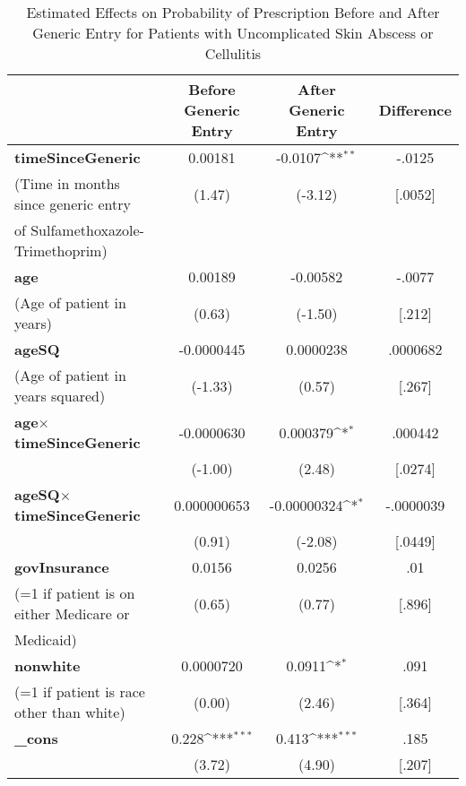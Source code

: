 \begin{table}[htbp]\centering
\def\sym#1{\ifmmode^{#1}\else\(^{#1}\)\fi}
\caption{Estimated Effects on Probability of Prescription Before and After Generic Entry for Patients with Uncomplicated Skin Abscess or Cellulitis\label{tab1}}
\begin{tabular}{l*{3}{c}}
\hline\hline
            &\multicolumn{1}{c}{Before Generic Entry}&\multicolumn{1}{c}{After Generic Entry}&\multicolumn{1}{c}{Difference}\\
\hline
\textbf{timeSinceGeneric}&     0.00181         &     -0.0107\sym{**} & -.0125\\
(Time in months since generic entry            &      (1.47)         &     (-3.12) & [.0052]\\
of Sulfamethoxazole-Trimethoprim)\\
[1em]
\textbf{age}         &     0.00189         &    -0.00582 & -.0077\\
(Age of patient in years)            &      (0.63)         &     (-1.50) & [.212]\\
[1em]
\textbf{ageSQ}       &  -0.0000445         &   0.0000238 & .0000682\\
(Age of patient in years squared)            &     (-1.33)         &      (0.57) & [.267]\\
[1em]
\textbf{age}$\times$\textbf{timeSinceGeneric}      &  -0.0000630         &    0.000379\sym{*}& .000442 \\
            &     (-1.00)         &      (2.48)         & [.0274]\\
[1em]
\textbf{ageSQ}$\times$\textbf{timeSinceGeneric}    & 0.000000653         & -0.00000324\sym{*}  & -.0000039\\
            &      (0.91)         &     (-2.08)         & [.0449]\\
[1em]
\textbf{govInsurance}&      0.0156         &      0.0256         & .01\\
(=1 if patient is on either Medicare or            &      (0.65)         &      (0.77)         & [.896]\\
Medicaid)\\
[1em]
\textbf{nonwhite}    &   0.0000720         &      0.0911\sym{*}  & .091\\
(=1 if patient is race other than white)            &      (0.00)         &      (2.46)         & [.364]\\
[1em]
\textbf{\_cons}      &       0.228\sym{***}&       0.413\sym{***} & .185\\
            &      (3.72)         &      (4.90)         & [.207] \\

\end{tabular}
\end{table}
